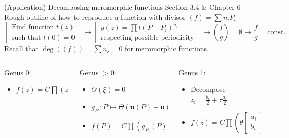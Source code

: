 \documentclass[11pt,aspectratio=169]{beamer}
\begin{document}
\begin{frame}{(Application) Decomposing meromorphic functions}{\tiny \cite{Cha22} Section 3.4 \& \cite{Ber06} Chapter 6}
    Rough outline of how to reproduce a function with divisor $(f) = \sum n_i P_i$
    \[ \begin{bmatrix}\text{Find function }t(z) \\ \text{such that }t(0)=0\end{bmatrix} \rightarrow \begin{bmatrix} g(z)=\prod t(P-P_i)^{n_i} \\ \text{respecting possible periodicity}\end{bmatrix} \rightarrow \left(\frac{f}{g}\right) = \emptyset \rightarrow \frac{f}{g} = \text{const.} \]
    Recall that $\deg((f)) = \sum n_i = 0$ for meromorphic functions.
    \vspace{+1em}
    \begin{columns}[t]
        \begin{column}{0.3\textwidth}
            Genus 0:
            \begin{itemize}
                \item $f(z) = C \prod (z-z_i)^{n_i}$
            \end{itemize}
        \end{column}

        \begin{column}{0.3\textwidth}
            Genus $>0$:
            \begin{itemize}
                \item $\Theta(\xi) = 0$
                \item $g_{P'} : P \mapsto \Theta(\mathbf{u}(P)-\mathbf{u}(P')+\xi)$
                \item $f(P) = C \prod \left(g_{P_i}(P)\right)^{n_i}$
            \end{itemize}
        \end{column}

        \begin{column}{0.35\textwidth}
            Genus 1:
            \begin{itemize}
                \item Decompose $z_i = \frac{b_i}{2} + \tau \frac{a_i}{2}$
                \item $f(z) = C \prod \left(\theta\begin{bmatrix}a_i \\ b_i\end{bmatrix}(z)\right)^{n_i}$
            \end{itemize}
        \end{column}
    \end{columns}
\end{frame}
\end{document}
